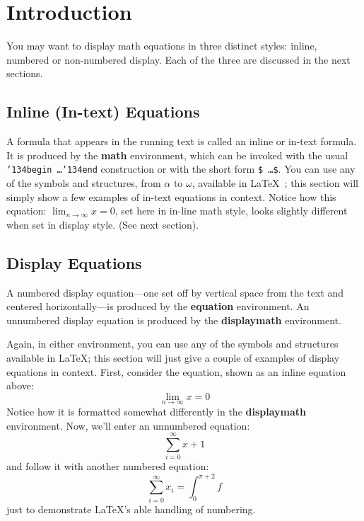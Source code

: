 \documentclass[sigplan,screen]{acmart}
\begin{document}
\section{Introduction}
You may want to display math equations in three distinct styles:
inline, numbered or non-numbered display.  Each of the three are
discussed in the next sections.

\subsection{Inline (In-text) Equations}
A formula that appears in the running text is called an inline or
in-text formula.  It is produced by the \textbf{math} environment,
which can be invoked with the usual
\texttt{{\char'134}begin\,\ldots{\char'134}end} construction or with
the short form \texttt{\$\,\ldots\$}. You can use any of the symbols
and structures, from $\alpha$ to $\omega$, available in
\LaTeX~\cite{Lamport:LaTeX}; this section will simply show a few
examples of in-text equations in context. Notice how this equation:
\begin{math}
  \lim_{n\rightarrow \infty}x=0
\end{math},
set here in in-line math style, looks slightly different when
set in display style.  (See next section).

\subsection{Display Equations}
A numbered display equation---one set off by vertical space from the
text and centered horizontally---is produced by the \textbf{equation}
environment. An unnumbered display equation is produced by the
\textbf{displaymath} environment.

Again, in either environment, you can use any of the symbols and
structures available in \LaTeX\@; this section will just give a couple
of examples of display equations in context.  First, consider the
equation, shown as an inline equation above:
\begin{equation}
  \lim_{n\rightarrow \infty}x=0
\end{equation}
Notice how it is formatted somewhat differently in
the \textbf{displaymath}
environment.  Now, we'll enter an unnumbered equation:
\begin{displaymath}
  \sum_{i=0}^{\infty} x + 1
\end{displaymath}
and follow it with another numbered equation:
\begin{equation}
  \sum_{i=0}^{\infty}x_i=\int_{0}^{\pi+2} f
\end{equation}
just to demonstrate \LaTeX's able handling of numbering.
\end{document}
